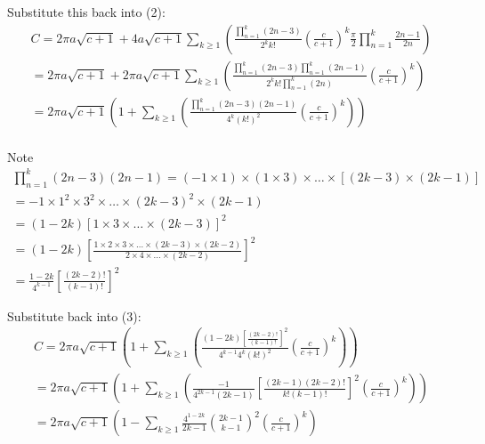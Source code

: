 \documentclass{article}
\begin{document}
Substitute this back into (2):
\begin{equation}
\begin{split}
	C = 
	2\pi a\sqrt{c+1} +
	4a\sqrt{c+1}\sum_{k\geq 1}\left( \frac{\prod_{n=1}^{k}(2n-3)}{2^kk!}\left(\frac{c}{c+1}\right)^k\frac{\pi}{2}\prod_{n=1}^{k}\frac{2n-1}{2n}\right)\\
	= 2\pi a\sqrt{c+1} +
	2\pi a\sqrt{c+1}\sum_{k\geq 1}\left( \frac{\prod_{n=1}^{k}(2n-3)\prod_{n=1}^{k}(2n-1)}{2^kk!\prod_{n=1}^k(2n)}\left(\frac{c}{c+1}\right)^k\right)\\
	= 2\pi a\sqrt{c+1} \left(1 + 
	\sum_{k\geq 1}\left( \frac{\prod_{n=1}^{k}(2n-3)(2n-1)}{4^k(k!)^2}\left(\frac{c}{c+1}\right)^k\right)\right)\\
\end{split}
\end{equation}

Note
\begin{equation}
\begin{split}
	\prod_{n=1}^k(2n-3)(2n-1)
	= (-1 \times 1) \times (1\times 3)\times\dots\times[(2k-3)\times(2k-1)]\\
	= -1 \times 1^2 \times 3^2 \times\dots\times(2k-3)^2 \times (2k-1)\\
	= (1-2k)\left[1\times3\times\dots\times(2k-3)\right]^2\\
	= (1-2k)\left[\frac{1\times2\times3\times\dots\times(2k-3)\times(2k-2)}{2\times4\times\dots\times(2k-2)}\right]^2\\
	= \frac{1-2k}{4^{k-1}}\left[\frac{(2k-2)!}{(k-1)!}\right]^2
\end{split}
\end{equation}

Substitute back into (3):
\begin{equation*}
\begin{split}
	C
	= 2\pi a\sqrt{c+1} \left(1 + 
	\sum_{k\geq 1}\left( \frac{(1-2k)\left[\frac{(2k-2)!}{(k-1)!}\right]^2}{4^{k-1}4^k(k!)^2}\left(\frac{c}{c+1}\right)^k\right)\right)\\
	= 2\pi a\sqrt{c+1} \left(1 + 
	\sum_{k\geq 1}\left( \frac{-1}{4^{2k-1}(2k-1)}\left[\frac{(2k-1)(2k-2)!}{k!(k-1)!}\right]^2\left(\frac{c}{c+1}\right)^k\right)\right)\\
	= 2\pi a\sqrt{c+1} \left(1 -
	\sum_{k\geq 1} \frac{4^{1-2k}}{2k-1}{{2k-1}\choose{k-1}}^2\left(\frac{c}{c+1}\right)^k\right)\\
\end{split}
\end{equation*}
\end{document}
